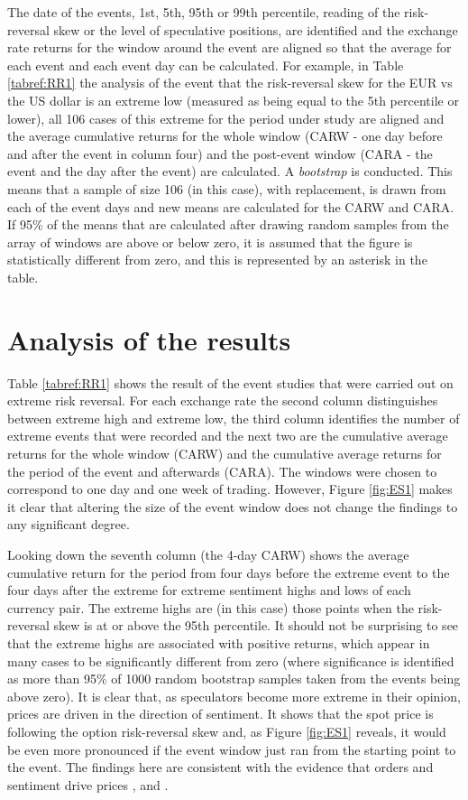 \documentclass[12pt, a4paper, oneside]{article} %
\begin{document}
  The date of the events, 1st, 5th, 95th or 99th percentile, reading of the risk-reversal skew or the level of speculative positions,  are identified and the exchange rate returns for the window around the event are aligned so that the average for each event and each event day can be calculated.  For example, in Table \ref{tabref:RR1} the analysis of the event that the risk-reversal skew for the EUR vs the US dollar is an extreme low (measured as being equal to the 5th percentile or lower), all 106 cases of this extreme for the period under study are aligned and the average cumulative returns for the whole window (CARW - one day before and after the event in column four) and the post-event window (CARA - the event and the day after the event) are calculated.   A \emph{bootstrap} is conducted.  This means that a sample of size 106 (in this case), with replacement, is drawn from each of the event days and new means are calculated for the CARW and CARA.   If 95\% of the means that are calculated after drawing random samples from the array of windows are above or below zero, it is assumed that the figure is statistically different from zero, and this is represented by an asterisk in the table. 

\section{Analysis of the results}
Table \ref{tabref:RR1} shows the result of the event studies that were carried out on extreme risk reversal.  
For each exchange rate the second column distinguishes between extreme high and extreme low, the third  column identifies the number of extreme events that were recorded and the next two are the cumulative average returns for the whole window (CARW) and the cumulative average returns for the period of the event and afterwards (CARA).  The windows were chosen to correspond to one day and one week of trading.  However, Figure \ref{fig:ES1} makes it clear that altering the size of the event window does not change the findings to any significant degree.

Looking down the seventh column (the 4-day CARW) shows the average cumulative return for the period from four days before the extreme event to the four days after the extreme for extreme sentiment highs and lows of each currency pair.   The extreme highs are (in this case) those points when the risk-reversal skew is at or above the 95th percentile.  It should not be surprising to see that the extreme highs are associated with positive returns, which appear in many cases to be significantly different from zero (where significance is identified as more than 95\% of 1000 random bootstrap samples taken from the events being above zero).  
It is clear that, as speculators become more extreme in their opinion, prices are driven in the direction of sentiment.  It shows that the spot price is following the option risk-reversal skew and, as Figure \ref{fig:ES1} reveals, it would be even more pronounced if the event window just ran from the starting point to the event.  The findings here are consistent with the evidence that orders and sentiment drive prices \citep{Evans2002Order}, \citep{FuturesSanders} and \citep{FuturesWang}. 
\end{document}
